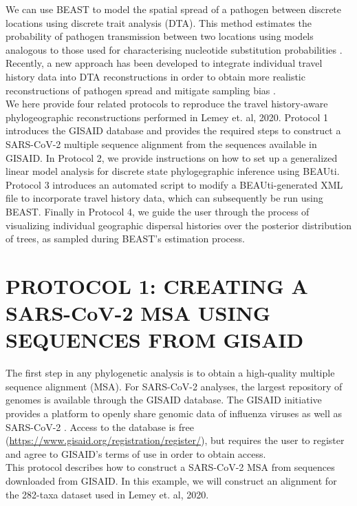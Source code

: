 \documentclass{article}
\begin{document}
We can use BEAST to model the spatial spread of a pathogen between discrete locations using discrete trait analysis (DTA).
This method estimates the probability of pathogen transmission between two locations using models analogous to those used for characterising nucleotide substitution probabilities \cite{dta}.
Recently, a new approach has been developed to integrate individual travel history data into DTA reconstructions in order to obtain more realistic reconstructions of pathogen spread and mitigate sampling bias \cite{travhist}. \\

We here provide four related protocols to reproduce the travel history-aware phylogeographic reconstructions performed in Lemey et. al, 2020. %
Protocol 1 introduces the GISAID database and provides the required steps to construct a SARS-CoV-2 multiple sequence alignment from the sequences available in GISAID.
In Protocol 2, we provide instructions on how to set up a generalized linear model analysis for discrete state phylogegraphic inference using BEAUti.
Protocol 3 introduces an automated script to modify a BEAUti-generated XML file to incorporate travel history data, which can subsequently be run using BEAST.
Finally in Protocol 4, we guide the user through the process of visualizing individual geographic dispersal histories over the posterior distribution of trees, as sampled during BEAST's estimation process.


\section*{PROTOCOL 1: CREATING A SARS-CoV-2 MSA USING SEQUENCES FROM GISAID}

The first step in any phylogenetic analysis is to obtain a high-quality multiple sequence alignment (MSA).
For SARS-CoV-2 analyses, the largest repository of genomes is available through the GISAID database.
The GISAID initiative provides a platform to openly share genomic data of influenza viruses as well as SARS-CoV-2 \cite{gisaid}.
Access to the database is free (\url{https://www.gisaid.org/registration/register/}), but requires the user to register and agree to GISAID's terms of use in order to obtain access.\\

This protocol describes how to construct a SARS-CoV-2 MSA from sequences downloaded from GISAID. In this example, we will construct an alignment for the 282-taxa dataset used in Lemey et. al, 2020. %
\end{document}
